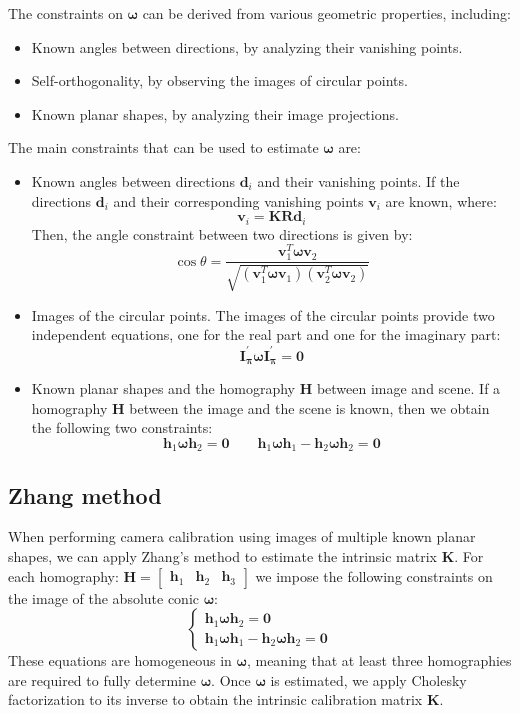 The constraints on $\boldsymbol{\omega}$ can be derived from various geometric properties, including:
\begin{itemize}
    \item Known angles between directions, by analyzing their vanishing points.
    \item Self-orthogonality, by observing the images of circular points.
    \item Known planar shapes, by analyzing their image projections.
\end{itemize}
The main constraints that can be used to estimate $\boldsymbol{\omega}$ are: 
\begin{itemize}
    \item Known angles between directions $\mathbf{d}_i$ and their vanishing points. 
        If the directions $\mathbf{d}_i$ and their corresponding vanishing points $\mathbf{v}_i$ are known, where:
        \[\mathbf{v}_i=\mathbf{KRd}_i\]
        Then, the angle constraint between two directions is given by:
        \[\cos\theta=\dfrac{\mathbf{v}_1^T\boldsymbol{\omega}\mathbf{v}_2}{\sqrt{\left(\mathbf{v}_1^T\boldsymbol{\omega}\mathbf{v}_1\right)\left(\mathbf{v}_2^T\boldsymbol{\omega}\mathbf{v}_2\right)}}\]
    \item Images of the circular points. 
        The images of the circular points provide two independent equations, one for the real part and one for the imaginary part:
        \[\mathbf{I}^\prime_{\boldsymbol{\pi}}\boldsymbol{\omega}\mathbf{I}^\prime_{\boldsymbol{\pi}}=\mathbf{0}\]
    \item Known planar shapes and the homography $\mathbf{H}$ between image and scene. 
        If a homography $\mathbf{H}$ between the image and the scene is known, then we obtain the following two constraints:
        \[\mathbf{h}_1\boldsymbol{\omega}\mathbf{h}_2=\mathbf{0} \qquad \mathbf{h}_1\boldsymbol{\omega}\mathbf{h}_1-\mathbf{h}_2\boldsymbol{\omega}\mathbf{h}_2=\mathbf{0}\]
\end{itemize}

\subsection{Zhang method}
When performing camera calibration using images of multiple known planar shapes, we can apply Zhang's method to estimate the intrinsic matrix $\mathbf{K}$.
For each homography: $\mathbf{H}=\begin{bmatrix} \mathbf{h}_1 & \mathbf{h}_2 & \mathbf{h}_3 \end{bmatrix}$ we impose the following constraints on the image of the absolute conic $\boldsymbol{\omega}$:
\[\begin{cases} \mathbf{h}_1\boldsymbol{\omega}\mathbf{h}_2=\mathbf{0} \\ \mathbf{h}_1\boldsymbol{\omega}\mathbf{h}_1-\mathbf{h}_2\boldsymbol{\omega}\mathbf{h}_2=\mathbf{0} \end{cases}\]
These equations are homogeneous in $\boldsymbol{\omega}$, meaning that at least three homographies are required to fully determine $\boldsymbol{\omega}$.
Once $\boldsymbol{\omega}$ is estimated, we apply Cholesky factorization to its inverse to obtain the intrinsic calibration matrix $\mathbf{K}$.


